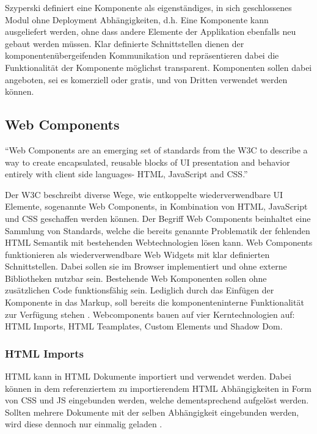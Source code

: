 Szyperski definiert eine Komponente als eigenständiges, in sich geschlossenes Modul ohne Deployment
Abhängigkeiten, d.h. Eine Komponente kann ausgeliefert werden, ohne dass andere Elemente der Applikation ebenfalls neu gebaut werden müssen.
Klar definierte Schnittstellen dienen der komponentenübergeifenden Kommunikation und repräsentieren
dabei die Funktionalität der Komponente möglichst transparent.
Komponenten sollen dabei angeboten, sei es komerziell oder gratis,
und von Dritten verwendet werden können.


\subsection{Web Components}

``Web Components are an emerging set of standards from the W3C to describe a way to create encapsulated,
reusable blocks of UI presentation and behavior entirely with client side languages- HTML, JavaScript and CSS.''
\cite[42]{Web-Component-Architecture}
\vspace{0.3cm}

Der W3C beschreibt diverse Wege, wie entkoppelte wiederverwendbare UI Elemente, sogenannte Web Components,
in Kombination von \ac{HTML}, JavaScript und \ac{CSS} geschaffen werden können.
Der Begriff Web Components beinhaltet eine Sammlung von Standards,
welche die bereits genannte Problematik der fehlenden HTML Semantik mit bestehenden Webtechnologien lösen kann.
Web Components funktionieren als wiederverwendbare Web Widgets mit klar definierten Schnittstellen.
Dabei sollen sie im Browser implementiert und ohne externe Bibliotheken nutzbar sein.
Bestehende Web Komponenten sollen ohne zusätzlichen Code funktionsfähig sein. Lediglich durch das Einfügen der Komponente
in das Markup, soll bereits die komponenteninterne Funktionalität zur Verfügung stehen
\cite[42]{Web-Component-Architecture}.
Webcomponents bauen auf vier Kerntechnologien auf: HTML Imports, HTML Teamplates, Custom Elements und Shadow Dom.

\subsubsection{HTML Imports}
HTML kann in HTML Dokumente importiert und verwendet werden.
Dabei können in dem referenziertem zu importierendem HTML Abhängigkeiten in Form von CSS und JS eingebunden werden,
welche dementsprechend aufgelöst werden.
Sollten mehrere Dokumente mit der selben Abhängigkeit eingebunden werden, wird diese dennoch nur einmalig geladen
\cite{HTMLI44:online}.

